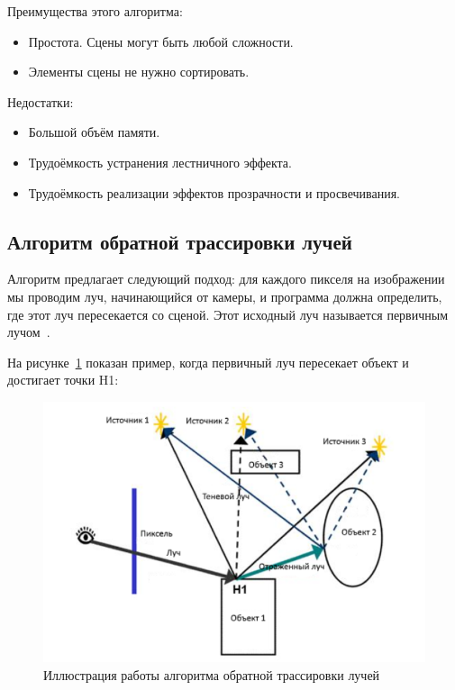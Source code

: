 Преимущества этого алгоритма:
\begin{itemize}
	\item Простота. Сцены могут быть любой сложности.
	\item Элементы сцены не нужно сортировать.
\end{itemize}

Недостатки:
\begin{itemize}
	\item Большой объём памяти.
	\item Трудоёмкость устранения лестничного эффекта.
	\item Трудоёмкость реализации эффектов прозрачности и просвечивания.
\end{itemize}

\subsection{Алгоритм обратной трассировки лучей}

Алгоритм предлагает следующий подход: для каждого пикселя на изображении мы проводим луч, начинающийся от камеры, и программа должна определить, где этот луч пересекается со сценой. 
Этот исходный луч называется первичным лучом~\cite{lectures}.

На рисунке~\ref{fig:ray_trace} показан пример, когда первичный луч пересекает объект и достигает точки H1:
\begin{figure}[h]
	\begin{center}
		\includegraphics[width=\linewidth]{photos/tras.png}
	\end{center}
	\caption{Иллюстрация работы алгоритма обратной трассировки лучей}
	\label{fig:ray_trace}
\end{figure}

